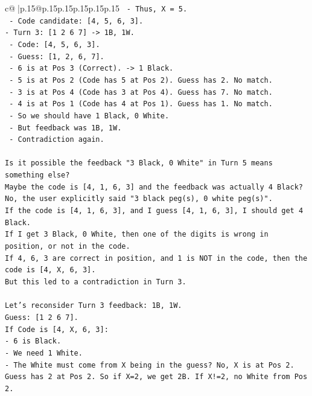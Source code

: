 \documentclass{article}
\begin{document}
{\begin{supertabular}{c@{$\;$}|p{.15\linewidth}@{}p{.15\linewidth}p{.15\linewidth}p{.15\linewidth}p{.15\linewidth}p{.15\linewidth}}
{{{\texttt{  {-} Thus, X = 5.} \\
\texttt{  {-} Code candidate: {[}4, 5, 6, 3{]}.} \\
\texttt{{-} Turn 3: {[}1 2 6 7{]} {-}> 1B, 1W.} \\
\texttt{  {-} Code: {[}4, 5, 6, 3{]}.} \\
\texttt{  {-} Guess: {[}1, 2, 6, 7{]}.} \\
\texttt{  {-} 6 is at Pos 3 (Correct). {-}> 1 Black.} \\
\texttt{  {-} 5 is at Pos 2 (Code has 5 at Pos 2). Guess has 2. No match.} \\
\texttt{  {-} 3 is at Pos 4 (Code has 3 at Pos 4). Guess has 7. No match.} \\
\texttt{  {-} 4 is at Pos 1 (Code has 4 at Pos 1). Guess has 1. No match.} \\
\texttt{  {-} So we should have 1 Black, 0 White.} \\
\texttt{  {-} But feedback was 1B, 1W.} \\
\texttt{  {-} Contradiction again.} \\
\\ 
\texttt{Is it possible the feedback "3 Black, 0 White" in Turn 5 means something else?} \\
\texttt{Maybe the code is {[}4, 1, 6, 3{]} and the feedback was actually 4 Black? No, the user explicitly said "3 black peg(s), 0 white peg(s)".} \\
\texttt{If the code is {[}4, 1, 6, 3{]}, and I guess {[}4, 1, 6, 3{]}, I should get 4 Black.} \\
\texttt{If I get 3 Black, 0 White, then one of the digits is wrong in position, or not in the code.} \\
\texttt{If 4, 6, 3 are correct in position, and 1 is NOT in the code, then the code is {[}4, X, 6, 3{]}.} \\
\texttt{But this led to a contradiction in Turn 3.} \\
\\ 
\texttt{Let's reconsider Turn 3 feedback: 1B, 1W.} \\
\texttt{Guess: {[}1 2 6 7{]}.} \\
\texttt{If Code is {[}4, X, 6, 3{]}:} \\
\texttt{{-} 6 is Black.} \\
\texttt{{-} We need 1 White.} \\
\texttt{{-} The White must come from X being in the guess? No, X is at Pos 2. Guess has 2 at Pos 2. So if X=2, we get 2B. If X!=2, no White from Pos 2.} \\
}}}
\end{supertabular}}
\end{document}
